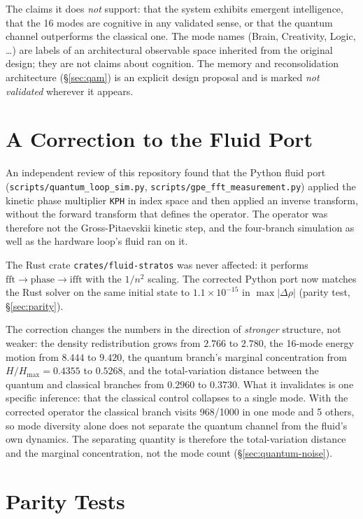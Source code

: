 \documentclass[sigconf,anonymous=false]{acmart}
\begin{document}
The claims it does \emph{not} support: that the system exhibits emergent intelligence, that the
16 modes are cognitive in any validated sense, or that the quantum channel outperforms the
classical one. The mode names (Brain, Creativity, Logic, \dots) are labels of an architectural
observable space inherited from the original design; they are not claims about cognition. The
memory and reconsolidation architecture (\S\ref{sec:qam}) is an explicit design proposal and is
marked \emph{not validated} wherever it appears.

\section{A Correction to the Fluid Port}

\label{sec:correction}

An independent review of this repository found that the Python fluid port
(\texttt{scripts/quantum\_loop\_sim.py}, \texttt{scripts/gpe\_fft\_measurement.py}) applied the
kinetic phase multiplier \texttt{KPH} in index space and then applied an inverse transform, without
the forward transform that defines the operator. The operator was therefore not the Gross-Pitaevskii
kinetic step, and the four-branch simulation as well as the hardware loop's fluid ran on it.

The Rust crate \texttt{crates/fluid-stratos} was never affected: it performs
$\text{fft} \to \text{phase} \to \text{ifft}$ with the $1/n^2$ scaling. The corrected Python port
now matches the Rust solver on the same initial state to $1.1\times 10^{-15}$ in
$\max|\Delta\rho|$ (parity test, \S\ref{sec:parity}).

The correction changes the numbers in the direction of \emph{stronger} structure, not weaker:
the density redistribution grows from $2.766$ to $2.780$, the 16-mode energy motion from $8.444$
to $9.420$, the quantum branch's marginal concentration from $H/H_{\max}=0.4355$ to $0.5268$, and
the total-variation distance between the quantum and classical branches from $0.2960$ to $0.3730$.
What it invalidates is one specific inference: that the classical control collapses to a single
mode. With the corrected operator the classical branch visits 968/1000 in one mode and 5 others,
so mode diversity alone does not separate the quantum channel from the fluid's own dynamics.
The separating quantity is therefore the total-variation distance and the marginal concentration,
not the mode count (\S\ref{sec:quantum-noise}).

\section{Parity Tests}
\end{document}
